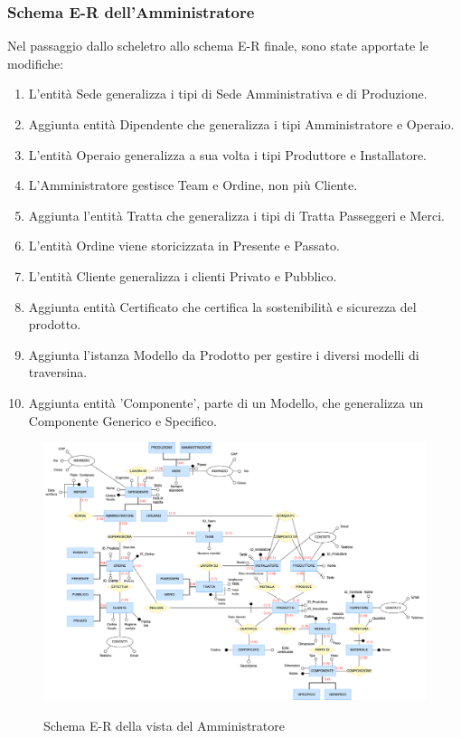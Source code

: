 \documentclass{article}
\begin{document}
\subsubsection{Schema E-R dell'Amministratore}
Nel passaggio dallo scheletro allo schema E-R finale, sono state apportate le modifiche:
\begin{enumerate}
    \item L'entità Sede generalizza i tipi di Sede Amministrativa e di Produzione.
    \item Aggiunta entità Dipendente che generalizza i tipi Amministratore e Operaio.
    \item L'entità Operaio generalizza a sua volta i tipi Produttore e Installatore.
    \item L'Amministratore gestisce Team e Ordine, non più Cliente.
    \item Aggiunta l'entità Tratta che generalizza i tipi di Tratta Passeggeri e Merci.
    \item L'entità Ordine viene storicizzata in Presente e Passato.
    \item L'entità Cliente generalizza i clienti Privato e Pubblico.
    \item Aggiunta entità Certificato che certifica la sostenibilità e sicurezza del prodotto.
    \item Aggiunta l'istanza Modello da Prodotto per gestire i diversi modelli di traversina.
    \item Aggiunta entità 'Componente', parte di un Modello, che generalizza un Componente Generico e Specifico.
\end{enumerate}

\begin{figure}[H]
    \centering
    \includegraphics[width=17cm]{images/rivisto_amministratore.drawio.png}\\
    \caption{Schema E-R della vista del Amministratore}
\end{figure}
\end{document}
